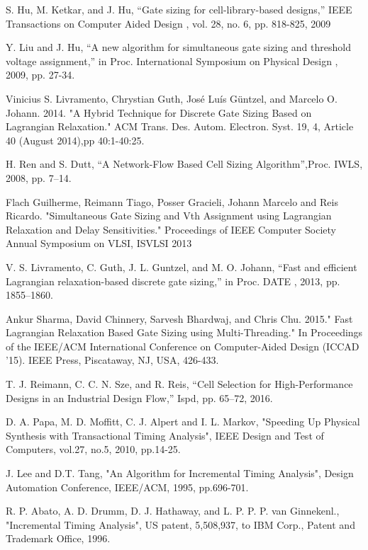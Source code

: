 \begin{thebibliography}{1}
S. Hu, M. Ketkar, and J. Hu, “Gate sizing for cell-library-based designs,”
IEEE Transactions on Computer Aided Design
, vol. 28, no. 6, pp. 818-825, 2009

Y. Liu and J. Hu, “A new algorithm for simultaneous gate sizing and
threshold voltage assignment,” in
Proc.  International  Symposium  on
Physical Design
, 2009, pp. 27-34.

 Vinicius S. Livramento, Chrystian Guth, José Luís Güntzel, and Marcelo O. Johann. 2014. "A Hybrid Technique for Discrete Gate Sizing Based on Lagrangian Relaxation." ACM Trans. Des. Autom. Electron. Syst. 19, 4, Article 40 (August 2014),pp 40:1-40:25.  

H. Ren and S. Dutt, “A Network-Flow Based Cell Sizing Algorithm”,Proc. IWLS, 2008, pp. 7–14.

Flach Guilherme,  Reimann Tiago, Posser Gracieli, Johann Marcelo and Reis Ricardo. "Simultaneous Gate Sizing and Vth Assignment using Lagrangian Relaxation and Delay Sensitivities." Proceedings of IEEE Computer Society Annual Symposium on VLSI, ISVLSI 2013

V. S. Livramento, C. Guth, J. L. Guntzel, and M. O. Johann, “Fast
and efficient Lagrangian relaxation-based discrete gate sizing,” in
Proc. DATE , 2013, pp. 1855–1860.

 

 Ankur Sharma, David Chinnery, Sarvesh Bhardwaj, and Chris Chu. 2015." Fast Lagrangian Relaxation Based Gate Sizing using Multi-Threading." In Proceedings of the IEEE/ACM International Conference on Computer-Aided Design (ICCAD '15). IEEE Press, Piscataway, NJ, USA, 426-433. 

 T. J. Reimann, C. C. N. Sze, and R. Reis, “Cell Selection for High-Performance Designs in an Industrial Design Flow,” Ispd, pp. 65–72, 2016.

D. A. Papa, M. D. Moffitt, C. J. Alpert and I. L. Markov, "Speeding Up Physical Synthesis with Transactional Timing Analysis", IEEE Design and Test of Computers, vol.27, no.5, 2010, pp.14-25.



J. Lee and D.T. Tang, "An Algorithm for Incremental Timing Analysis", Design Automation Conference, IEEE/ACM, 1995, pp.696-701.

R. P. Abato, A. D. Drumm, D. J. Hathaway, and L. P. P. P. van Ginnekenl., "Incremental Timing Analysis", US patent, 5,508,937, to IBM Corp., Patent and Trademark Office, 1996.


\end{thebibliography}
